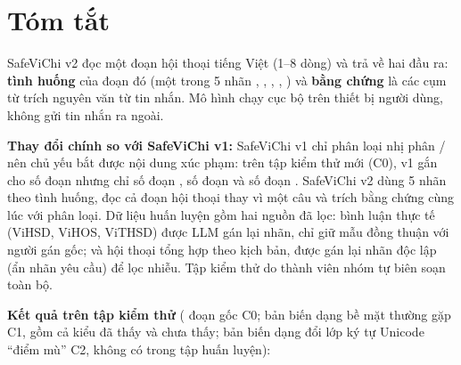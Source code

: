 {%
\setlength{\parskip}{0.25em}
\setlength{\intextsep}{4pt plus 1pt minus 1pt}
\renewcommand{\arraystretch}{1.04}
\section*{Tóm tắt}

SafeViChi v2 đọc một đoạn hội thoại tiếng Việt (1--8 dòng) và trả về hai đầu ra: \textbf{tình huống} của đoạn đó
(một trong 5 nhãn , , , , ) và
\textbf{bằng chứng} là các cụm từ trích nguyên văn từ tin nhắn. Mô hình chạy cục bộ trên thiết bị người dùng, không gửi
tin nhắn ra ngoài.

\textbf{Thay đổi chính so với SafeViChi v1:}
SafeViChi v1 chỉ phân loại nhị phân / nên chủ yếu bắt được nội dung xúc phạm: trên tập kiểm
thử mới (C0), v1 gắn  cho  số đoạn  nhưng chỉ  số đoạn
,  số đoạn  và  số đoạn .
SafeViChi v2 dùng 5 nhãn theo tình huống, đọc cả đoạn hội thoại thay vì một câu và trích bằng chứng cùng lúc với phân
loại. Dữ liệu huấn luyện gồm hai nguồn đã lọc: bình luận thực tế (ViHSD, ViHOS, ViTHSD) được LLM gán lại nhãn, chỉ giữ mẫu đồng thuận với người gán gốc; và hội thoại tổng hợp theo kịch bản, được gán lại nhãn độc lập (ẩn nhãn yêu cầu) để lọc nhiễu. Tập kiểm thử do thành viên nhóm tự biên soạn toàn bộ.

\textbf{Kết quả trên tập kiểm thử} ( đoạn gốc C0;  bản biến dạng bề mặt thường
gặp C1, gồm cả kiểu đã thấy và chưa thấy;  bản biến dạng đổi lớp ký tự Unicode ``điểm mù'' C2, không có
trong tập huấn luyện):

}
